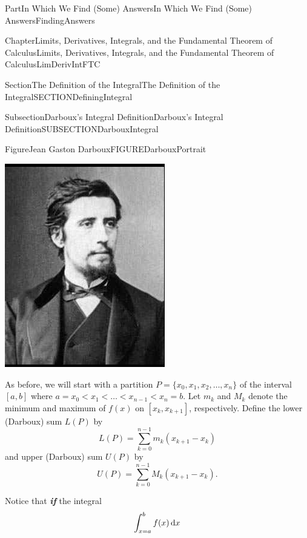 \documentclass[oneside,10pt,]{book}
\newcommand{\alert}[1]{\textbf{\textit{#1}}}
\numberwithin{equation}{part}
\newcommand{\dx}[1]{\,{\rm d}#1}
\newcommand{\lt}{<}
\begin{document}
\begin{partptx}{Part}{In Which We Find (Some) Answers}{}{In Which We Find (Some) Answers}{}{}{FindingAnswers}
\begin{chapterptx}{Chapter}{Limits, Derivatives, Integrals, and the Fundamental Theorem of Calculus}{}{Limits, Derivatives, Integrals, and the Fundamental Theorem of Calculus}{}{}{LimDerivIntFTC}
\begin{sectionptx}{Section}{The Definition of the Integral}{}{The Definition of the Integral}{}{}{SECTIONDefiningIntegral}
\begin{subsectionptx}{Subsection}{Darboux's Integral Definition}{}{Darboux's Integral Definition}{}{}{SUBSECTIONDarbouxIntegral}
\begin{figureptx}{Figure}{Jean Gaston Darboux}{FIGUREDarbouxPortrait}{}
\begin{image}{0.325}{0.35}{0.325}{}
\includegraphics[width=\linewidth]{external/images/Darboux.png}
\end{image}%
\tcblower
\end{figureptx}%
As before, we will start with a partition \(P=\{x_0, x_1,x_2,
\dots , x_n\}\) of the interval \([a,b]\) where \(a=x_0\lt
x_1\lt \dots \lt x_{n-1}\lt x_n=b\).  Let \(m_k\) and \(M_k\) denote the minimum and maximum of \(f(x)\) on \([x_k,x_{k+1}]\), respectively.  Define the lower (Darboux) sum \(L(P)\) by%
\begin{equation*}
L\left(P\right)=\sum^{n-1}_{k=0}{m_k\left(x_{k+1}-x_k\right)}
\end{equation*}
and upper (Darboux) sum \(U(P)\) by%
\begin{equation*}
U\left(P\right)=\sum^{n-1}_{k=0}{M_k\left(x_{k+1}-x_k\right)}\text{.}
\end{equation*}
%
\par
Notice that \alert{if} the integral%
\begin{equation*}
\int^b_{x=a}{f(x)\dx{x}}
\end{equation*}

\end{subsectionptx}
\end{sectionptx}
\end{chapterptx}
\end{partptx}
\end{document}
